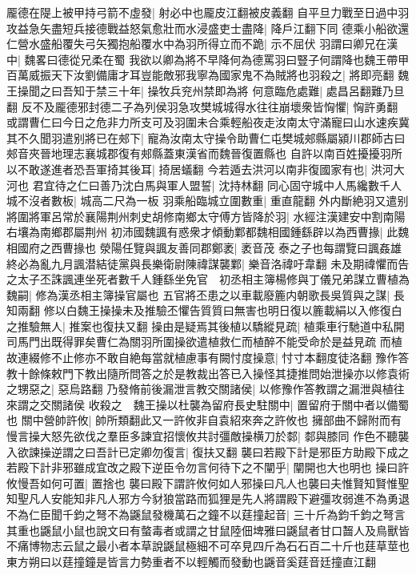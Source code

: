 龎德在隄上被甲持弓箭不虛發|{
	射必中也龎皮江翻被皮義翻}
自平旦力戰至日過中羽攻益急矢盡短兵接德戰益怒氣愈壯而水浸盛吏士盡降|{
	降戶江翻下同}
德乘小船欲還仁營水盛船覆失弓矢獨抱船覆水中為羽所得立而不跪|{
	示不屈伏}
羽謂曰卿兄在漢中|{
	魏畧曰德從兄柔在蜀}
我欲以卿為將不早降何為德罵羽曰豎子何謂降也魏王帶甲百萬威振天下汝劉備庸才耳豈能敵邪我寧為國家鬼不為賊將也羽殺之|{
	將即亮翻}
魏王操聞之曰吾知于禁三十年|{
	操牧兵兖州禁即為將}
何意臨危處難|{
	處昌呂翻難乃旦翻}
反不及龎德邪封德二子為列侯羽急攻樊城城得水往往崩壞衆皆恟懼|{
	恟許勇翻}
或謂曹仁曰今日之危非力所支可及羽圍未合乘輕船夜走汝南太守滿寵曰山水速疾冀其不久聞羽遣别將已在郟下|{
	寵為汝南太守操令助曹仁屯樊城郟縣屬潁川郡師古曰郟音夾晉地理志襄城郡復有郟縣蓋東漢省而魏晉復置縣也}
自許以南百姓擾擾羽所以不敢遂進者恐吾軍掎其後耳|{
	掎居蟻翻}
今若遁去洪河以南非復國家有也|{
	洪河大河也}
君宜待之仁曰善乃沈白馬與軍人盟誓|{
	沈持林翻}
同心固守城中人馬纔數千人城不沒者數板|{
	城高二尺為一板}
羽乘船臨城立圍數重|{
	重直龍翻}
外内斷絶羽又遣别將圍將軍呂常於襄陽荆州刺史胡修南鄉太守傅方皆降於羽|{
	水經注漢建安中割南陽右壤為南鄉郡屬荆州}
初沛國魏諷有惑衆才傾動鄴都魏相國鍾繇辟以為西曹掾|{
	此魏相國府之西曹掾也}
滎陽任覽與諷友善同郡鄭袤|{
	袤音茂}
泰之子也每謂覽曰諷姦雄終必為亂九月諷潜結徒黨與長樂衛尉陳禕謀襲鄴|{
	樂音洛禕吁韋翻}
未及期禕懼而告之太子丕誅諷連坐死者數千人鍾繇坐免官　初丞相主簿楊修與丁儀兄弟謀立曹植為魏嗣|{
	修為漢丞相主簿操官屬也}
五官將丕患之以車載廢簏内朝歌長吳質與之謀|{
	長知兩翻}
修以白魏王操操未及推驗丕懼告質質曰無害也明日復以簏載絹以入修復白之推驗無人|{
	推案也復扶又翻}
操由是疑焉其後植以驕縱見疏|{
	植乘車行馳道中私開司馬門出既得罪矣曹仁為關羽所圍操欲遣植救仁而植醉不能受命於是益見疏}
而植故連綴修不止修亦不敢自絶每當就植慮事有闕忖度操意|{
	忖寸本翻度徒洛翻}
豫作答教十餘條敕門下教出隨所問答之於是教裁出答已入操怪其捷推問始泄操亦以修袁術之甥惡之|{
	惡烏路翻}
乃發脩前後漏泄言教交關諸侯|{
	以修豫作答教謂之漏泄與植往來謂之交關諸侯}
收殺之　魏王操以杜襲為留府長史駐關中|{
	置留府于關中者以備蜀也}
關中營帥許攸|{
	帥所類翻此又一許攸非自袁紹來奔之許攸也}
擁部曲不歸附而有慢言操大怒先欲伐之羣臣多諫宜招懷攸共討彊敵操横刀於䣛|{
	䣛與膝同}
作色不聽襲入欲諫操逆謂之曰吾計已定卿勿復言|{
	復扶又翻}
襲曰若殿下計是邪臣方助殿下成之若殿下計非邪雖成宜改之殿下逆臣令勿言何待下之不闡乎|{
	闡開也大也明也}
操曰許攸慢吾如何可置|{
	置捨也}
襲曰殿下謂許攸何如人邪操曰凡人也襲曰夫惟賢知賢惟聖知聖凡人安能知非凡人邪方今豺狼當路而狐狸是先人將謂殿下避彊攻弱進不為勇退不為仁臣聞千鈞之弩不為鼷鼠發機萬石之鐘不以莛撞起音|{
	三十斤為鈞千鈞之弩言其重也鼷鼠小鼠也說文曰有螫毒者或謂之甘鼠陸佃埤雅曰鼷鼠者甘口齧人及鳥獸皆不痛博物志云鼠之最小者本草說鼷鼠極細不可卒見四斤為石石百二十斤也莛草莖也東方朔曰以莛撞鐘是皆言力勢重者不以輕觸而發動也鼷音奚莛音廷撞直江翻}
